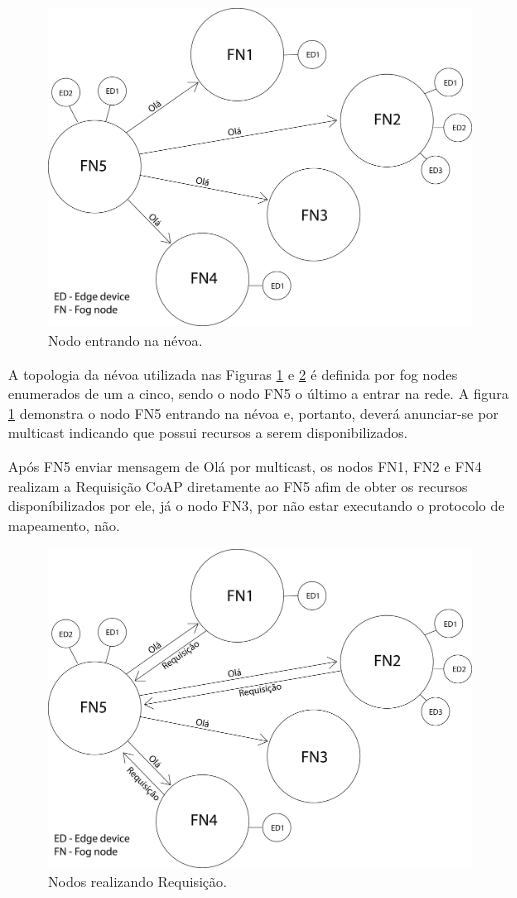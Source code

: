 \begin{figure}[H]
    \centering\includegraphics[width=.8\textwidth]{fig5.png}
    \caption%
    {\label{fig:fig5} Nodo entrando na névoa.}
\end{figure}

A topologia da névoa utilizada nas Figuras \ref{fig:fig5} e \ref{fig:fig6} é definida por fog nodes enumerados de um a cinco, sendo o nodo FN5 o último a entrar na rede.
A figura \ref{fig:fig5} demonstra o nodo FN5 entrando na névoa e, portanto, deverá anunciar-se por multicast indicando que possui recursos a serem disponibilizados.

Após FN5 enviar mensagem de Olá por multicast, os nodos FN1, FN2 e FN4 realizam a Requisição CoAP diretamente ao FN5 afim de obter os recursos disponíbilizados por ele,
já o nodo FN3, por não estar executando o protocolo de mapeamento, não.

\begin{figure}[H]
    \centering\includegraphics[width=.8\textwidth]{fig6.png}
    \caption%
    {\label{fig:fig6} Nodos realizando Requisição.}
\end{figure}


